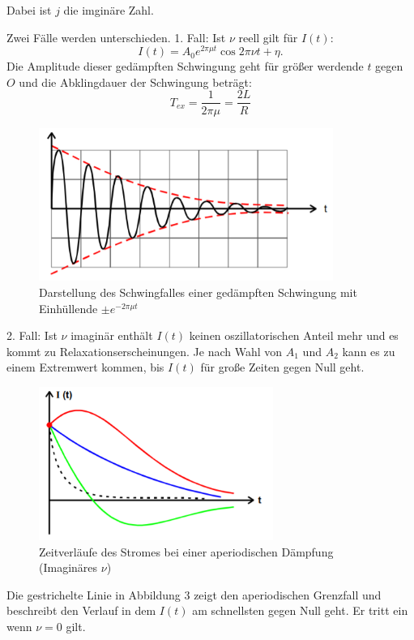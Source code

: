 Dabei ist $j$ die imginäre Zahl.

Zwei Fälle werden unterschieden.
1. Fall: Ist $\nu$ reell gilt für $I(t)$:
\begin{equation}
  I(t) = A_0 e^{2\pi \mu t} \cos{2\pi \nu t + \eta}.
\end{equation}
Die Amplitude dieser gedämpften Schwingung geht für größer werdende $t$ gegen $O$ und die
Abklingdauer der Schwingung beträgt:
\begin{equation}
  T_{ex} =\frac{1}{2\pi \mu} = \frac{2L}{R}
\end{equation}

\begin{figure}[H]
  \centering
  \includegraphics[height=5cm]{schwingfall.PNG}
  \caption{Darstellung des Schwingfalles einer gedämpften Schwingung mit Einhüllende $\pm e^{-2\pi \mu t}$}
  \label{fig:schwingfall}
\end{figure}

2. Fall: Ist $\nu$ imaginär enthält $I(t)$ keinen oszillatorischen Anteil mehr und es kommt
zu Relaxationserscheinungen. Je nach Wahl von $A_1$ und $A_2$ kann es zu einem Extremwert kommen, bis
$I(t)$ für große Zeiten gegen Null geht.

\begin{figure}[H]
  \centering
  \includegraphics[height=5cm]{grenzfall.PNG}
  \caption{Zeitverläufe des Stromes bei einer aperiodischen Dämpfung (Imaginäres $\nu$)}
  \label{fig:grenzfall}
\end{figure}

Die gestrichelte Linie in Abbildung 3 zeigt den aperiodischen Grenzfall und beschreibt den Verlauf
in dem $I(t)$ am schnellsten gegen Null geht. Er tritt ein wenn $\nu = 0$ gilt.



